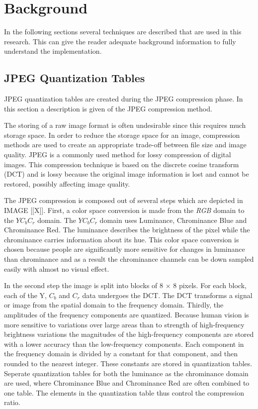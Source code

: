 
\chapter{Background} %

\label{ch:background} %

In the following sections several techniques are described that are used in this research. This can give the reader adequate background information to fully understand the implementation.


\section{JPEG Quantization Tables}
JPEG quantization tables are created during the JPEG compression phase. In this section a description is given of the JPEG compression method.

The storing of a raw image format is often undesirable since this requires much storage space. In order to reduce the storage space for an image, compression methods are used to create an appropriate trade-off between file size and image quality. JPEG is a commonly used method for lossy compression of digital images. This compression technique is based on the discrete cosine transform (DCT) and is lossy because the original image information is lost and cannot be restored, possibly affecting image quality. 

The JPEG compression is composed out of several steps which are depicted in IMAGE [[X]]. First, a color space conversion is made from the \textit{RGB} domain to the $YC_bC_r$  domain. The $YC_bC_r$ domain uses Luminance, Chrominance Blue and Chrominance Red. The luminance describes the brightness of the pixel while the chrominance carries information about its hue. This color space conversion is chosen because people are significantly more sensitive for changes in luminance than chrominance and as a result the chrominance channels can be down sampled easily with almost no visual effect. 

In the second step the image is split into blocks of 8 $\times$ 8 pixels. For each block, each of the Y, $C_b$ and $C_r$ data undergoes the DCT. The DCT transforms a signal or image from the spatial domain to the frequency domain. Thirdly, the amplitudes of the frequency components are quantized. Because human vision is more sensitive to variations over large areas than to strength of high-frequency brightness variations the magnitudes of the high-frequency components are stored with a lower accuracy than the low-frequency components. Each component in the frequency domain is divided by a constant for that component, and then rounded to the nearest integer. These constants are stored in quantization tables. Seperate quantization tables for both the luminance as the chrominance domain are used, where Chrominance Blue and Chrominance Red are often combined to one table. The elements in the quantization table thus control the compression ratio.

